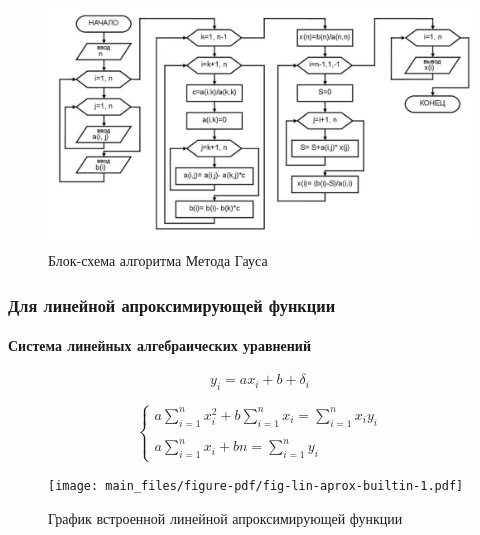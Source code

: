 \documentclass[
  letterpaper,
  DIV=11,
  numbers=noendperiod]{scrartcl}
\let\oldparagraph\paragraph
\renewcommand{\paragraph}[1]{\oldparagraph{#1}\mbox{}}
\begin{document}
\begin{figure}

{\centering \includegraphics{./Gaus.png}

}

\caption{\label{fig-gaus}Блок-схема алгоритма Метода Гауса}

\end{figure}

\subsubsection{Для линейной апроксимирующей
функции}\label{ux434ux43bux44f-ux43bux438ux43dux435ux439ux43dux43eux439-ux430ux43fux440ux43eux43aux441ux438ux43cux438ux440ux443ux44eux449ux435ux439-ux444ux443ux43dux43aux446ux438ux438}

\paragraph{Система линейных алгебраических
уравнений}\label{ux441ux438ux441ux442ux435ux43cux430-ux43bux438ux43dux435ux439ux43dux44bux445-ux430ux43bux433ux435ux431ux440ux430ux438ux447ux435ux441ux43aux438ux445-ux443ux440ux430ux432ux43dux435ux43dux438ux439}

\[y_i = a x_i + b + \delta_i\]

\[
\begin{cases}
a \sum_{i=1}^n x_i^2 + b \sum_{i=1}^n x_i = \sum_{i=1}^n x_i y_i \\ \\
a \sum_{i=1}^n x_i + b n = \sum_{i=1}^n y_i
\end{cases}
\]

\begin{figure}

{\centering \texttt{[image: main\_files/figure-pdf/fig-lin-aprox-builtin-1.pdf]}

}

\caption{\label{fig-lin-aprox-builtin}График встроенной линейной
апроксимирующей функции}

\end{figure}
\end{document}
